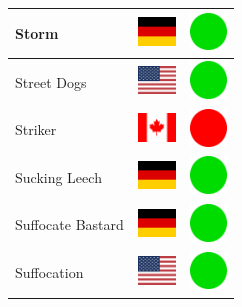 \documentclass[12pt, a4paper, twoside]{report}
\begin{document}
\begin{center}
\begin{longtable}{|p{5cm}|p{2cm}|p{2cm}|}
 Storm                                                      & \includegraphics[width=1cm]{../4x3/de} &   \includegraphics[width=1cm]{../likes/y} \\ \hline
 Street Dogs                                                & \includegraphics[width=1cm]{../4x3/us} &   \includegraphics[width=1cm]{../likes/y} \\ \hline
 Striker                                                    & \includegraphics[width=1cm]{../4x3/ca} &   \includegraphics[width=1cm]{../likes/n} \\ \hline
 Sucking Leech                                              & \includegraphics[width=1cm]{../4x3/de} &   \includegraphics[width=1cm]{../likes/y} \\ \hline
 Suffocate Bastard                                          & \includegraphics[width=1cm]{../4x3/de} &   \includegraphics[width=1cm]{../likes/y} \\ \hline
 Suffocation                                                & \includegraphics[width=1cm]{../4x3/us} &   \includegraphics[width=1cm]{../likes/y} \\ \hline

\end{longtable}
\end{center}
\end{document}

